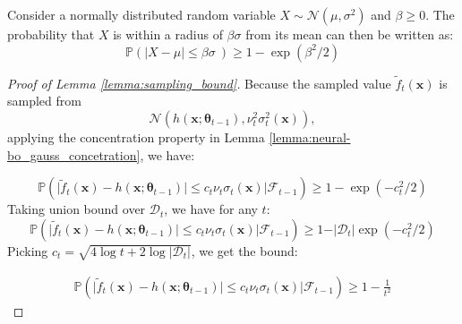 \begin{sublemma}
\label{lemma:neural-bo_gauss_concetration}
Consider a normally distributed random variable $X \sim \mathcal{N}(\mu, \sigma^2)$ and $\beta \geq 0$. The probability that $X$ is within a radius of $\beta \sigma$ from its mean can then be written as:
\[ \mathbb{P}(\lvert X - \mu\rvert \leq \beta  \sigma\ ) \geq 1-\exp(\beta^2/2)\]
\end{sublemma}
\begin{proof}[Proof of Lemma \ref{lemma:sampling_bound}]
Because the sampled value $\widetilde{f}_t(\mathbf{x})$ is sampled from  
\[
\mathcal{N}(h(\mathbf{x}; \boldsymbol{\theta}_{t-1}), \nu_t^2\sigma_t^2(\mathbf{x})),
\] 
applying the concentration property in Lemma \ref{lemma:neural-bo_gauss_concetration}, we have:

\[\mathbb{P}(\rvert \widetilde{f}_t(\mathbf{x}) -h(\mathbf{x}; \boldsymbol{\theta}_{t-1}) \lvert \leq c_t \nu_t \sigma_t(\mathbf{x}) \lvert \mathcal{F}_{t-1}) \geq 1-\exp(-c_t^2/2)
\]
Taking union bound over $\mathcal{D}_t$, we have for any $t$:
\[\mathbb{P}(\rvert \widetilde{f}_t(\mathbf{x}) - h(\mathbf{x}; \boldsymbol{\theta}_{t-1}) \lvert \leq c_t \nu_t \sigma_t(\mathbf{x}) \lvert \mathcal{F}_{t-1}) \geq 1-\rvert \mathcal{D}_t \rvert\exp(-c_t^2/2) \]
Picking $c_t = \sqrt{4 \log t + 2 \log \lvert \mathcal{D}_t \rvert}$, we get the bound:

 \begin{align*}
     \mathbb{P}(\rvert \widetilde{f}_t(\mathbf{x}) - h(\mathbf{x}; \boldsymbol{\theta}_{t-1}) \lvert \leq c_t \nu_t \sigma_t(\mathbf{x}) \lvert \mathcal{F}_{t-1}) \geq 1-\frac{1}{t^2}
 \end{align*}
\end{proof}

